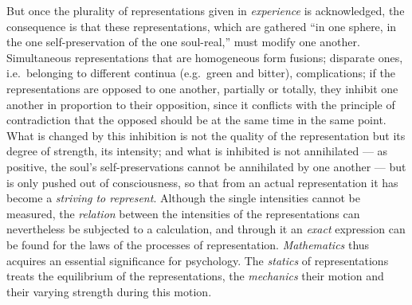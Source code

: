 But once the plurality of representations given in \emph{experience} is
acknowledged, the consequence is that these representations, which are
gathered ``in one sphere, in the one self-preservation of the one
soul-real,'' must modify one another. Simultaneous representations that
are homogeneous form fusions; disparate ones, i.e.\ belonging to
different continua (e.g.\ green and bitter), complications; if the
representations are opposed to one another, partially or totally, they
inhibit one another in proportion to their opposition, since it conflicts
with the principle of contradiction that the opposed should be at the
same time in the same point. What is changed by this inhibition is not
the quality of the representation but its degree of strength, its
intensity; and what is inhibited is not annihilated --- as positive, the
soul's self-preservations cannot be annihilated by one another --- but
is only pushed out of consciousness, so that from an actual
representation it has become a \emph{striving to represent}. Although the
single intensities cannot be measured, the \emph{relation} between the
intensities of the representations can nevertheless be subjected to a
calculation, and through it an \emph{exact} expression can be found for
the laws of the processes of representation. \emph{Mathematics} thus
acquires an essential significance for psychology. The \emph{statics} of
representations treats the equilibrium of the representations, the
\emph{mechanics} their motion and their varying strength during this
motion.

